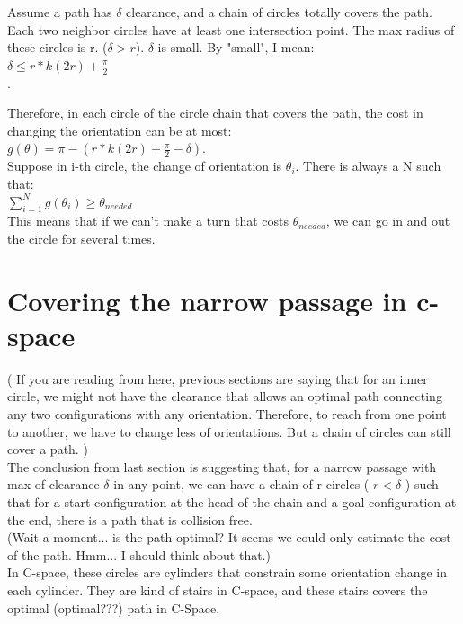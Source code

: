 \documentclass[12pt]{article}
\begin{document}
  Assume a path has $\delta$ clearance, and a chain of circles totally covers the path. Each two neighbor circles have at least one intersection point. The max radius of these circles is r. ($\delta > r$). $\delta$ is small. By "small", I mean:\\

  $\delta \leq r*k(2r) + \frac{\pi}{2}$\\.

  Therefore, in each circle of the circle chain that covers the path, the cost in changing the orientation can be at most:\\

  $g(\theta) = \pi - ( r*k(2r) + \frac{\pi}{2} - \delta)$.\\

  Suppose in i-th circle, the change of orientation is $\theta_{i}$. There is always a N such that:\\

  $\sum\limits_{i = 1}^N g(\theta_{i}) \geq \theta_{needed}$\\
  
  This means that if we can't make a turn that costs $\theta_{needed}$, we can go in and out the circle for several times.

  \section{Covering the narrow passage in c-space}

  ( If you are reading from here, previous sections are saying that for an inner circle, we might not have the clearance that allows an optimal path connecting any two configurations with any orientation. Therefore, to reach from one point to another, we have to change less of orientations. But a chain of circles can still cover a path. )\\

  The conclusion from last section is suggesting that, for a narrow passage with max of clearance $\delta$ in any point, we can have a chain of r-circles ( $r < \delta$ ) such that for a start configuration at the head of the chain and a goal configuration at the end, there is a path that is collision free.\\

  (Wait a moment... is the path optimal? It seems we could only estimate the cost of the path. Hmm... I should think about that.)\\

  In C-space, these circles are cylinders that constrain some orientation change in each cylinder. They are kind of stairs in C-space, and these stairs covers the optimal (optimal???) path in C-Space. \\
  
\end{document}
